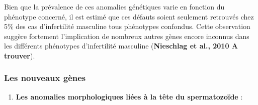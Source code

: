 \documentclass[12pt,twoside]{reedthesis}
\providecommand{\tightlist}{%
  \setlength{\itemsep}{0pt}\setlength{\parskip}{0pt}}
\theoremstyle{definition}
\theoremstyle{definition}
\theoremstyle{remark}
\begin{document}
  Bien que la prévalence de ces anomalies génétiques varie en fonction du
  phénotype concerné, il est estimé que ces défauts soient seulement
  retrouvés chez 5\% des cas d'infertilité masculine tous phénotypes
  confondus. Cette observation suggère fortement l'implication de nombreux
  autres gènes encore inconnus dans les différents phénotypes
  d'infertilité masculine (\textbf{Nieschlag et al., 2010 A trouver}).
  
  \subsubsection{Les nouveaux gènes}\label{les-nouveaux-genes}
  
  \begin{enumerate}
  \def\labelenumi{\arabic{enumi}.}
  \tightlist
  \item
    \textbf{Les anomalies morphologiques liées à la tête du spermatozoïde}
    :
  

\end{enumerate}
\end{document}
